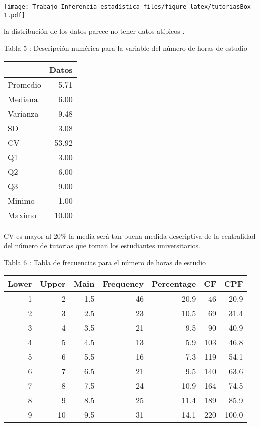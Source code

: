 \documentclass[
  man]{apa6}
\begin{document}
\texttt{[image: Trabajo-Inferencia-estadística\_files/figure-latex/tutoriasBox-1.pdf]}

la distribución de los datos parece no tener datos atípicos . \clearpage

Tabla 5 : Descripción numérica para la variable del número de horas de
estudio

\begin{center}

\begin{tabular}{l|r}
\hline
  & Datos\\
\hline
Promedio & 5.71\\
\hline
Mediana & 6.00\\
\hline
Varianza & 9.48\\
\hline
SD & 3.08\\
\hline
CV & 53.92\\
\hline
Q1 & 3.00\\
\hline
Q2 & 6.00\\
\hline
Q3 & 9.00\\
\hline
Minimo & 1.00\\
\hline
Maximo & 10.00\\
\hline
\end{tabular}
\end{center}

CV es mayor al 20\% la media será tan buena medida descriptiva de la
centralidad del número de tutorias que toman los estudiantes
universitarios.

Tabla 6 : Tabla de frecuencias para el número de horas de estudio

\begin{center}


\begin{tabular}{r|r|r|r|r|r|r}
\hline
Lower & Upper & Main & Frequency & Percentage & CF & CPF\\
\hline
1 & 2 & 1.5 & 46 & 20.9 & 46 & 20.9\\
\hline
2 & 3 & 2.5 & 23 & 10.5 & 69 & 31.4\\
\hline
3 & 4 & 3.5 & 21 & 9.5 & 90 & 40.9\\
\hline
4 & 5 & 4.5 & 13 & 5.9 & 103 & 46.8\\
\hline
5 & 6 & 5.5 & 16 & 7.3 & 119 & 54.1\\
\hline
6 & 7 & 6.5 & 21 & 9.5 & 140 & 63.6\\
\hline
7 & 8 & 7.5 & 24 & 10.9 & 164 & 74.5\\
\hline
8 & 9 & 8.5 & 25 & 11.4 & 189 & 85.9\\
\hline
9 & 10 & 9.5 & 31 & 14.1 & 220 & 100.0\\
\hline
\end{tabular}
\end{center}
\end{document}
